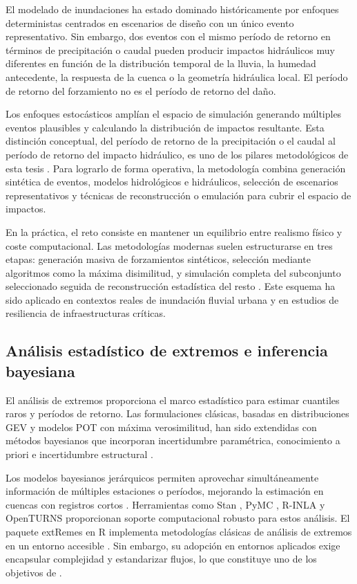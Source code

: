 El modelado de inundaciones ha estado dominado históricamente por enfoques deterministas centrados en escenarios de diseño con un único evento representativo. Sin embargo, dos eventos con el mismo período de retorno en términos de precipitación o caudal pueden producir impactos hidráulicos muy diferentes en función de la distribución temporal de la lluvia, la humedad antecedente, la respuesta de la cuenca o la geometría hidráulica local. El período de retorno del forzamiento no es el período de retorno del daño.

Los enfoques estocásticos amplían el espacio de simulación generando múltiples eventos plausibles y calculando la distribución de impactos resultante. Esta distinción conceptual, del período de retorno de la precipitación o el caudal al período de retorno del impacto hidráulico, es uno de los pilares metodológicos de esta tesis \parencite{navas2017jia,navas2018besaya,navas2024calle30}. Para lograrlo de forma operativa, la metodología combina generación sintética de eventos, modelos hidrológicos e hidráulicos, selección de escenarios representativos y técnicas de reconstrucción o emulación para cubrir el espacio de impactos.

En la práctica, el reto consiste en mantener un equilibrio entre realismo físico y coste computacional. Las metodologías modernas suelen estructurarse en tres etapas: generación masiva de forzamientos sintéticos, selección mediante algoritmos como la máxima disimilitud, y simulación completa del subconjunto seleccionado seguida de reconstrucción estadística del resto \parencite{ihcantabria2020foresee,ihcantabria2021m30}. Este esquema ha sido aplicado en contextos reales de inundación fluvial urbana y en estudios de resiliencia de infraestructuras críticas.

\subsection{Análisis estadístico de extremos e inferencia bayesiana}
\label{sec:extremos}

El análisis de extremos proporciona el marco estadístico para estimar cuantiles raros y períodos de retorno. Las formulaciones clásicas, basadas en distribuciones GEV y modelos POT con máxima verosimilitud, han sido extendidas con métodos bayesianos que incorporan incertidumbre paramétrica, conocimiento a priori e incertidumbre estructural \parencite{martins2000generalized,coles2001extremes}.

Los modelos bayesianos jerárquicos permiten aprovechar simultáneamente información de múltiples estaciones o períodos, mejorando la estimación en cuencas con registros cortos \parencite{cooley2007bayesian}. Herramientas como Stan \parencite{carpenter2017stan}, PyMC \parencite{salvatier2016pymc}, R-INLA \parencite{rue2009inla} y OpenTURNS \parencite{baudin2016openturns} proporcionan soporte computacional robusto para estos análisis. El paquete extRemes en R implementa metodologías clásicas de análisis de extremos en un entorno accesible \parencite{gilleland2016extremes}. Sin embargo, su adopción en entornos aplicados exige encapsular complejidad y estandarizar flujos, lo que constituye uno de los objetivos de \hydra.

